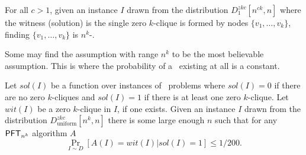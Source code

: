 

\begin{definition}\label{def:strongzkc}
	For all $c>1$, given an instance $I$ drawn from the distribution $D^{zkc}_{1}[n^{ck},n]$ where the witness (solution) is the single zero $k$-clique is formed by nodes $\{v_1,\ldots,v_k\}$, finding $\{v_1, \ldots, v_k\}$ is $n^k$-\ACSH.
\end{definition}


Some may find the assumption with range $n^k$ to be the most believable assumption. This is where the probability of a \zkclique~existing at all is a constant. %
\begin{definition}[\RandomZKC]
	Let $sol(I)$ be a function over instances of \zkclique~problems where $sol(I)=0$ if there are no zero $k$-cliques and $sol(I)=1$ if there is at least one zero $k$-clique. Let $wit(I)$ be a zero $k$-clique in $I$, if one exists.
	Given an instance $I$ drawn from the distribution $D^{zkc}_{\textrm{uniform}}[n^k,n]$ there is some large enough $n$ such that
	for any  $\mathsf{PFT}_{n^k}$ algorithm $A$
	\[ \Pr_{I \sim D}[A(I) = wit(I)| sol(I)=1] \le 1/200. \]
\end{definition}


